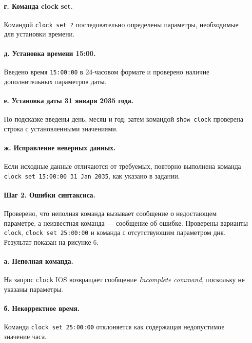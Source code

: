 \documentclass[a4paper,14pt,oneside]{extarticle}
\begin{document}
\paragraph{г. Команда clock set.}
Командой \texttt{clock set ?} последовательно определены параметры,
необходимые для установки времени.

\paragraph{д. Установка времени 15:00.}
Введено время \texttt{15:00:00} в 24-часовом формате и проверено наличие
дополнительных параметров даты.

\paragraph{е. Установка даты 31 января 2035 года.}
По подсказке введены день, месяц и год; затем командой \texttt{show clock}
проверена строка с установленными значениями.

\paragraph{ж. Исправление неверных данных.}
Если исходные данные отличаются от требуемых, повторно выполнена команда
\texttt{clock set 15:00:00 31 Jan 2035}, как указано в задании.

\paragraph{Шаг 2. Ошибки синтаксиса.}
Проверено, что неполная команда вызывает сообщение о недостающем параметре,
а неизвестная команда --- сообщение об ошибке. Проверены варианты
\texttt{clock}, \texttt{clock set 25:00:00} и команда с отсутствующим
параметром дня. Результат показан на рисунке 6.

\paragraph{а. Неполная команда.}
На запрос \texttt{clock} IOS возвращает сообщение
\textit{Incomplete command}, поскольку не указаны параметры.

\paragraph{б. Некорректное время.}
Команда \texttt{clock set 25:00:00} отклоняется как содержащая
недопустимое значение часа.
\end{document}
